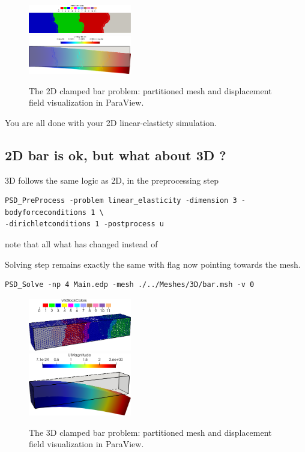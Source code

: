 \begin{figure}[h!]
\centering
\includegraphics[width=0.4\textwidth]{./Images/le-2d-bar-partioned.png}\\
\includegraphics[width=0.4\textwidth]{./Images/le-2d-bar-results.png}
\caption{The 2D clamped bar problem: partitioned mesh and displacement field visualization in ParaView. \label{bar-le-full}}
\end{figure}

You are all done with your 2D linear-elasticty simulation.

\subsection{2D bar is ok, but what about 3D ?}

3D follows the same logic as 2D, in the preprocessing step

\begin{lstlisting}[style=BashInputStyle]
PSD_PreProcess -problem linear_elasticity -dimension 3 -bodyforceconditions 1 \
-dirichletconditions 1 -postprocess u
\end{lstlisting}

note that all what has changed  instead of

Solving step remains exactly the same with  flag now pointing
towards the \psd{3D} mesh.

\begin{lstlisting}[style=BashInputStyle]
PSD_Solve -np 4 Main.edp -mesh ./../Meshes/3D/bar.msh -v 0
\end{lstlisting}

\begin{figure}[h!]
\centering
\includegraphics[width=0.4\textwidth]{./Images/le-3d-bar-clamped-ends.png}\\
\includegraphics[width=0.4\textwidth]{./Images/le-3d-bar-clamped-pulled-partioned.png}
\caption{The 3D clamped bar problem: partitioned mesh and displacement field visualization in ParaView. \label{3dbar-le-full}}
\end{figure}

